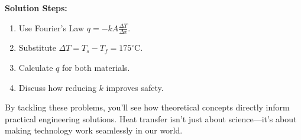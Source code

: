 \documentclass[12pt]{article}
\begin{document}
\textbf{Solution Steps:}
\begin{enumerate}
    \item Use Fourier's Law $ q = -k A \frac{\Delta T}{\Delta x} $.
    \item Substitute $ \Delta T = T_s - T_f = 175^\circ \text{C} $.
    \item Calculate $ q $ for both materials.
    \item Discuss how reducing $ k $ improves safety.
\end{enumerate}

By tackling these problems, you'll see how theoretical concepts directly inform practical engineering solutions. Heat transfer isn't just about science—it's about making technology work seamlessly in our world.
\end{document}
